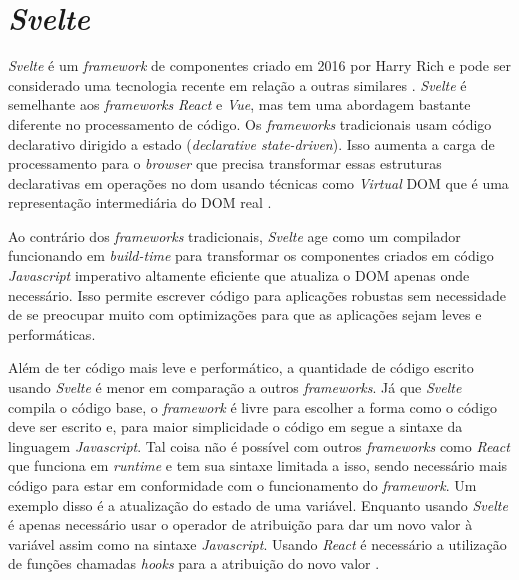\section{\textit{Svelte}}
\textit{Svelte} é um \textit{framework} de componentes criado em 2016 por Harry Rich e pode ser considerado uma tecnologia recente em relação a outras similares \cite{krill_slim_2016}. \textit{Svelte} é semelhante aos \textit{frameworks} \textit{React} e \textit{Vue}, mas tem uma abordagem bastante diferente no processamento de código. Os \textit{frameworks} tradicionais usam código declarativo dirigido a estado (\textit{declarative state-driven}). Isso aumenta a carga de processamento para o \textit{browser} que precisa transformar essas estruturas declarativas em operações no \gls{dom} usando técnicas como \textit{Virtual} DOM que é uma representação intermediária do DOM real \cite{harris_svelte_2019}.

Ao contrário dos \textit{frameworks} tradicionais, \textit{Svelte} age como um compilador funcionando em \textit{build-time} para transformar os componentes criados em código \textit{Javascript} imperativo altamente eficiente que atualiza o DOM apenas onde necessário. Isso permite escrever código para aplicações robustas sem necessidade de se preocupar muito com optimizações para que as aplicações sejam leves e performáticas.

Além de ter código mais leve e performático, a quantidade de código escrito usando \textit{Svelte} é menor em comparação a outros \textit{frameworks}. Já que \textit{Svelte} compila o código base, o \textit{framework} é livre para escolher a forma como o código deve ser escrito e, para maior simplicidade o código em  segue a sintaxe da linguagem \textit{Javascript}. Tal coisa não é possível com outros \textit{frameworks} como \textit{React} que funciona em \textit{runtime} e tem sua sintaxe limitada a isso, sendo necessário mais código para estar em conformidade com o funcionamento do \textit{framework}. Um exemplo disso é a atualização do estado de uma variável. Enquanto usando \textit{Svelte} é apenas necessário usar o operador de atribuição para dar um novo valor à variável assim como na sintaxe \textit{Javascript}. Usando \textit{React} é necessário a utilização de funções chamadas \textit{hooks} para a atribuição do novo valor \cite{harris_write_2019}.
